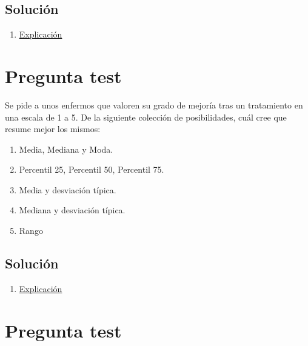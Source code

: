 \documentclass[
]{book}
\providecommand{\tightlist}{%
  \setlength{\itemsep}{0pt}\setlength{\parskip}{0pt}}
\begin{document}
\hypertarget{soluciuxf3n-34}{%
\subsection{Solución}\label{soluciuxf3n-34}}

\begin{enumerate}
\def\labelenumi{\alph{enumi})}
\tightlist
\item
  \href{https://en.wikipedia.org/wiki/Coefficient_of_variation}{Explicación}
\end{enumerate}

\hypertarget{pregunta-test-33}{%
\section{Pregunta test}\label{pregunta-test-33}}

Se pide a unos enfermos que valoren su grado de mejoría tras un tratamiento en una escala de 1 a 5. De la siguiente colección de posibilidades, cuál cree que resume mejor los mismos:

\begin{enumerate}
\def\labelenumi{\alph{enumi})}
\tightlist
\item
  Media, Mediana y Moda.
\item
  Percentil 25, Percentil 50, Percentil 75.
\item
  Media y desviación típica.
\item
  Mediana y desviación típica.
\item
  Rango
\end{enumerate}

\hypertarget{soluciuxf3n-35}{%
\subsection{Solución}\label{soluciuxf3n-35}}

\begin{enumerate}
\def\labelenumi{\alph{enumi})}
\setcounter{enumi}{1}
\tightlist
\item
  \href{https://1fjmanzano.github.io/bioestadistica/medidas-de-posicio\%CC\%81n-dispersio\%CC\%81n-y-forma.html\#medidas-de-dispersio\%CC\%81n}{Explicación}
\end{enumerate}

\hypertarget{pregunta-test-34}{%
\section{Pregunta test}\label{pregunta-test-34}}
\end{document}
